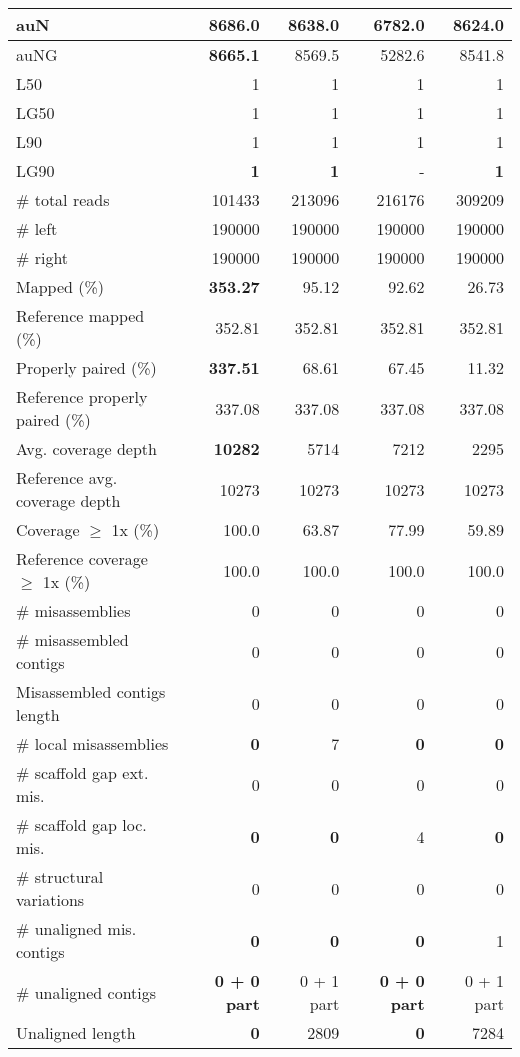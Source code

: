 \documentclass[12pt,a4paper]{article}
\begin{document}
\begin{table}[ht]
\begin{center}
\begin{tabular}{|l*{4}{|r}|}
auN & {\bf 8686.0} & 8638.0 & 6782.0 & 8624.0 \\ \hline
auNG & {\bf 8665.1} & 8569.5 & 5282.6 & 8541.8 \\ \hline
L50 & 1 & 1 & 1 & 1 \\ \hline
LG50 & 1 & 1 & 1 & 1 \\ \hline
L90 & 1 & 1 & 1 & 1 \\ \hline
LG90 & {\bf 1} & {\bf 1} & - & {\bf 1} \\ \hline
\# total reads & 101433 & 213096 & 216176 & 309209 \\ \hline
\# left & 190000 & 190000 & 190000 & 190000 \\ \hline
\# right & 190000 & 190000 & 190000 & 190000 \\ \hline
Mapped (\%) & {\bf 353.27} & 95.12 & 92.62 & 26.73 \\ \hline
Reference mapped (\%) & 352.81 & 352.81 & 352.81 & 352.81 \\ \hline
Properly paired (\%) & {\bf 337.51} & 68.61 & 67.45 & 11.32 \\ \hline
Reference properly paired (\%) & 337.08 & 337.08 & 337.08 & 337.08 \\ \hline
Avg. coverage depth & {\bf 10282} & 5714 & 7212 & 2295 \\ \hline
Reference avg. coverage depth & 10273 & 10273 & 10273 & 10273 \\ \hline
Coverage $\geq$ 1x (\%) & 100.0 & 63.87 & 77.99 & 59.89 \\ \hline
Reference coverage $\geq$ 1x (\%) & 100.0 & 100.0 & 100.0 & 100.0 \\ \hline
\# misassemblies & 0 & 0 & 0 & 0 \\ \hline
\# misassembled contigs & 0 & 0 & 0 & 0 \\ \hline
Misassembled contigs length & 0 & 0 & 0 & 0 \\ \hline
\# local misassemblies & {\bf 0} & 7 & {\bf 0} & {\bf 0} \\ \hline
\# scaffold gap ext. mis. & 0 & 0 & 0 & 0 \\ \hline
\# scaffold gap loc. mis. & {\bf 0} & {\bf 0} & 4 & {\bf 0} \\ \hline
\# structural variations & 0 & 0 & 0 & 0 \\ \hline
\# unaligned mis. contigs & {\bf 0} & {\bf 0} & {\bf 0} & 1 \\ \hline
\# unaligned contigs & {\bf 0 + 0 part} & 0 + 1 part & {\bf 0 + 0 part} & 0 + 1 part \\ \hline
Unaligned length & {\bf 0} & 2809 & {\bf 0} & 7284 \\ \hline

\end{tabular}
\end{center}
\end{table}
\end{document}
